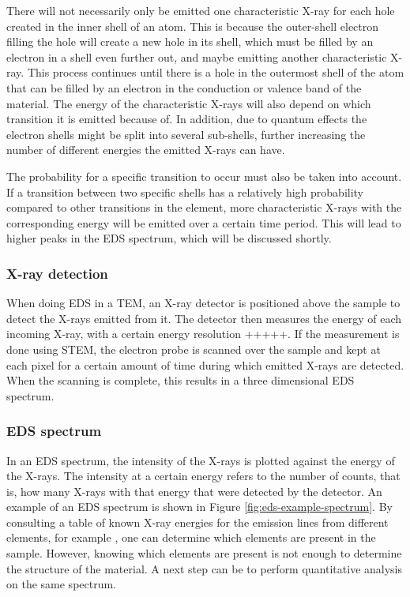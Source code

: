 There will not necessarily only be emitted one characteristic X-ray for each hole created in the inner shell of an atom. This is because the outer-shell electron filling the hole will create a new hole in its shell, which must be filled by an electron in a shell even further out, and maybe emitting another characteristic X-ray. This process continues until there is a hole in the outermost shell of the atom that can be filled by an electron in the conduction or valence band of the material. The energy of the characteristic X-rays will also depend on which transition it is emitted because of. In addition, due to quantum effects the electron shells might be split into several sub-shells, further increasing the number of different energies the emitted X-rays can have.

The probability for a specific transition to occur must also be taken into account. If a transition between two specific shells has a relatively high probability compared to other transitions in the element, more characteristic X-rays with the corresponding energy will be emitted over a certain time period. This will lead to higher peaks in the EDS spectrum, which will be discussed shortly.

		\subsubsection{X-ray detection}
When doing EDS in a TEM, an X-ray detector is positioned above the sample to detect the X-rays emitted from it. The detector then measures the energy of each incoming X-ray, with a certain energy resolution +++++. If the measurement is done using STEM, the electron probe is scanned over the sample and kept at each pixel for a certain amount of time during which emitted X-rays are detected. When the scanning is complete, this results in a three dimensional EDS spectrum.

		\subsubsection{EDS spectrum}\label{sec:eds-spec}
In an EDS spectrum, the intensity of the X-rays is plotted against the energy of the X-rays. The intensity at a certain energy refers to the number of counts, that is, how many X-rays with that energy that were detected by the detector. An example of an EDS spectrum is shown in Figure \ref{fig:eds-example-spectrum}. By consulting a table of known X-ray energies for the emission lines from different elements, for example \cite{x-ray-booklet}, one can determine which elements are present in the sample. However, knowing which elements are present is not enough to determine the structure of the material. A next step can be to perform quantitative analysis on the same spectrum.

